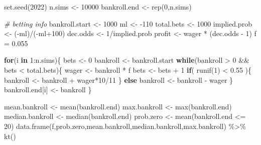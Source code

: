 \documentclass[
  11pt,
]{book}
\newenvironment{Shaded}{\begin{snugshade}}{\end{snugshade}}
\newcommand{\CommentTok}[1]{\textcolor[rgb]{0.56,0.35,0.01}{\textit{#1}}}
\newcommand{\ControlFlowTok}[1]{\textcolor[rgb]{0.13,0.29,0.53}{\textbf{#1}}}
\newcommand{\DecValTok}[1]{\textcolor[rgb]{0.00,0.00,0.81}{#1}}
\newcommand{\FloatTok}[1]{\textcolor[rgb]{0.00,0.00,0.81}{#1}}
\newcommand{\FunctionTok}[1]{\textcolor[rgb]{0.00,0.00,0.00}{#1}}
\newcommand{\NormalTok}[1]{#1}
\newcommand{\OtherTok}[1]{\textcolor[rgb]{0.56,0.35,0.01}{#1}}
\newcommand{\SpecialCharTok}[1]{\textcolor[rgb]{0.00,0.00,0.00}{#1}}
\theoremstyle{definition}
\theoremstyle{definition}
\theoremstyle{definition}
\theoremstyle{definition}
\theoremstyle{remark}
\begin{document}
\begin{Shaded}
\begin{Highlighting}[]
\FunctionTok{set.seed}\NormalTok{(}\DecValTok{2022}\NormalTok{)}
\NormalTok{n.sims }\OtherTok{\textless{}{-}} \DecValTok{10000}
\NormalTok{bankroll.end }\OtherTok{\textless{}{-}} \FunctionTok{rep}\NormalTok{(}\DecValTok{0}\NormalTok{,n.sims)}

\CommentTok{\# betting info}
\NormalTok{bankroll.start }\OtherTok{\textless{}{-}} \DecValTok{1000}
\NormalTok{ml }\OtherTok{\textless{}{-}} \SpecialCharTok{{-}}\DecValTok{110}
\NormalTok{total.bets }\OtherTok{\textless{}{-}} \DecValTok{1000}
\NormalTok{implied.prob }\OtherTok{\textless{}{-}}\NormalTok{ (}\SpecialCharTok{{-}}\NormalTok{ml)}\SpecialCharTok{/}\NormalTok{(}\SpecialCharTok{{-}}\NormalTok{ml}\SpecialCharTok{+}\DecValTok{100}\NormalTok{)}
\NormalTok{dec.odds }\OtherTok{\textless{}{-}} \DecValTok{1}\SpecialCharTok{/}\NormalTok{implied.prob}
\NormalTok{profit }\OtherTok{\textless{}{-}}\NormalTok{ wager }\SpecialCharTok{*}\NormalTok{ (dec.odds }\SpecialCharTok{{-}} \DecValTok{1}\NormalTok{)}
\NormalTok{f }\OtherTok{=} \FloatTok{0.055}

\ControlFlowTok{for}\NormalTok{(i }\ControlFlowTok{in} \DecValTok{1}\SpecialCharTok{:}\NormalTok{n.sims)\{}
\NormalTok{  bets }\OtherTok{\textless{}{-}} \DecValTok{0}
\NormalTok{  bankroll }\OtherTok{\textless{}{-}}\NormalTok{ bankroll.start}
  \ControlFlowTok{while}\NormalTok{(bankroll }\SpecialCharTok{\textgreater{}} \DecValTok{0} \SpecialCharTok{\&\&}\NormalTok{ bets }\SpecialCharTok{\textless{}}\NormalTok{ total.bets)\{}
\NormalTok{    wager }\OtherTok{\textless{}{-}}\NormalTok{ bankroll }\SpecialCharTok{*}\NormalTok{ f}
\NormalTok{    bets }\OtherTok{\textless{}{-}}\NormalTok{ bets }\SpecialCharTok{+} \DecValTok{1}
    \ControlFlowTok{if}\NormalTok{( }\FunctionTok{runif}\NormalTok{(}\DecValTok{1}\NormalTok{) }\SpecialCharTok{\textless{}} \FloatTok{0.55}\NormalTok{ )\{}
\NormalTok{      bankroll }\OtherTok{\textless{}{-}}\NormalTok{ bankroll }\SpecialCharTok{+}\NormalTok{ wager}\SpecialCharTok{*}\DecValTok{10}\SpecialCharTok{/}\DecValTok{11}
\NormalTok{    \} }\ControlFlowTok{else}
\NormalTok{      bankroll }\OtherTok{\textless{}{-}}\NormalTok{ bankroll }\SpecialCharTok{{-}}\NormalTok{ wager}
\NormalTok{  \}}
\NormalTok{  bankroll.end[i] }\OtherTok{\textless{}{-}}\NormalTok{ bankroll}
\NormalTok{\}}

\NormalTok{mean.bankroll }\OtherTok{\textless{}{-}} \FunctionTok{mean}\NormalTok{(bankroll.end)}
\NormalTok{max.bankroll }\OtherTok{\textless{}{-}} \FunctionTok{max}\NormalTok{(bankroll.end)}
\NormalTok{median.bankroll }\OtherTok{\textless{}{-}} \FunctionTok{median}\NormalTok{(bankroll.end)}
\NormalTok{prob.zero }\OtherTok{\textless{}{-}} \FunctionTok{mean}\NormalTok{(bankroll.end }\SpecialCharTok{\textless{}=} \DecValTok{20}\NormalTok{)}
\FunctionTok{data.frame}\NormalTok{(f,prob.zero,mean.bankroll,median.bankroll,max.bankroll) }\SpecialCharTok{\%\textgreater{}\%} \FunctionTok{kt}\NormalTok{()}
\end{Highlighting}
\end{Shaded}
\end{document}

